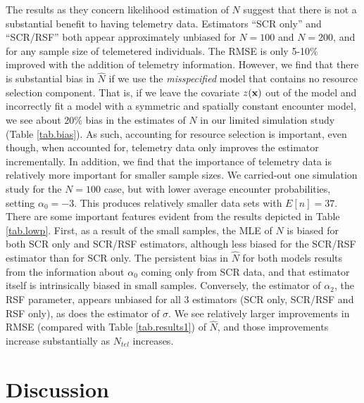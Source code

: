 \documentclass[12pt]{article}
\begin{document}
The results as they concern likelihood estimation of $N$ suggest that
there is not a substantial benefit to having telemetry
data. Estimators ``SCR only'' and ``SCR/RSF'' both appear
approximately unbiased for $N=100$ and $N=200$, and for any sample
size of telemetered individuals. The RMSE is only 5-10\% improved with
the addition of telemetry information.  However, we find that there is
substantial bias in $\hat{N}$ if we use the {\it misspecified} model
that contains no resource selection component. That is, if we leave the
covariate $z({\bf x})$ out of the model and incorrectly fit a model
with a symmetric and spatially constant encounter model, we see about
20\% bias in the estimates of $N$ in our limited simulation study
(Table \ref{tab.bias}). As such, accounting for resource
selection is important, even though, when accounted for, telemetry
data only improves the estimator incrementally.
In addition, we find that the importance of telemetry data is
relatively more important for smaller sample sizes. We carried-out one
simulation study for the $N=100$ case, but with lower average encounter
probabilities, setting $\alpha_{0}=-3$. This produces
relatively smaller data sets with  $E[n] = 37$. 
There are some important features evident from
the results depicted in Table \ref{tab.lowp}.
 First, as a result of the small samples, the MLE of $N$ is
biased for both SCR only and SCR/RSF estimators, although less biased
for the SCR/RSF estimator than for SCR only. The persistent bias in
$\hat{N}$ for both models results from the information about
$\alpha_{0}$ coming only from SCR data, and that estimator itself is
intrinsically biased in small samples.  Conversely, the estimator of
$\alpha_{2}$, the RSF parameter, appears unbiased for all 3 estimators
(SCR only, SCR/RSF and RSF only), as does the estimator of $\sigma$.
We see relatively larger improvements in RMSE (compared with Table
\ref{tab.results1}) of $\hat{N}$, and those improvements
increase substantially as $N_{tel}$ increases.









\section{Discussion}
\end{document}
